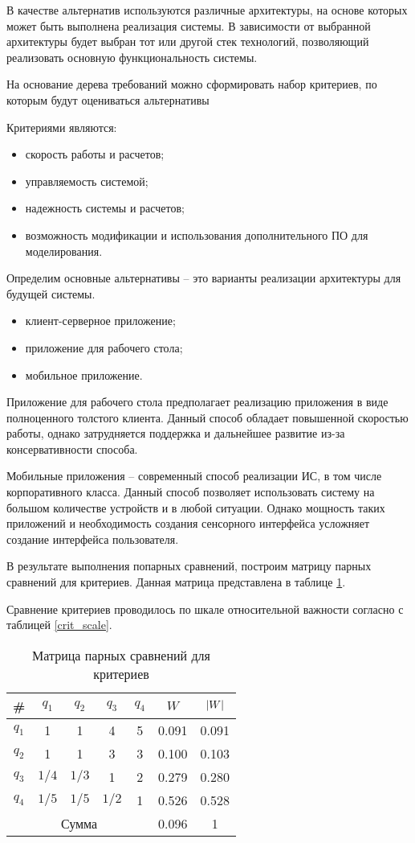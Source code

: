 В качестве альтернатив используются различные архитектуры, на основе которых может быть выполнена реализация системы. 
В зависимости от выбранной архитектуры будет выбран тот или другой стек технологий, позволяющий реализовать основную функциональность системы. 

На основание дерева требований можно сформировать набор критериев, по которым будут оцениваться альтернативы

Критериями являются:
\begin{itemize}
  \item скорость работы и расчетов;
  \item управляемость системой;
  \item надежность системы и расчетов;
  \item возможность модификации и использования дополнительного ПО для моделирования.
\end{itemize}

Определим основные альтернативы – это варианты реализации архитектуры для будущей системы.
\begin{itemize}
    \item клиент-серверное приложение;
    \item приложение для рабочего стола;
    \item мобильное приложение.
\end{itemize}

Приложение для рабочего стола предполагает реализацию приложения в виде полноценного толстого клиента. 
Данный способ обладает повышенной скоростью работы, однако затрудняется поддержка и дальнейшее развитие из-за консервативности способа. 

Мобильные приложения – современный способ реализации ИС, в том числе корпоративного класса. 
Данный способ позволяет использовать систему на большом количестве устройств и в любой ситуации. 
Однако мощность таких приложений и необходимость создания сенсорного интерфейса усложняет создание интерфейса пользователя.

В результате выполнения попарных сравнений, построим матрицу парных сравнений для критериев. 
Данная матрица представлена в таблице \ref{crit_compare}.

Сравнение критериев проводилось по шкале относительной важности согласно с таблицей \ref{crit_scale}.

\begin{table}[H]
    \centering
    \caption{Матрица парных сравнений для критериев}\label{crit_compare}
    \begin{tabular}{|c|c|c|c|c|c|c|}
    \hline \# & $q_1$ & $q_2$ & $q_3$ & $q_4$ & $W$ & $\abs{W}$ \\
    \hline $q_1$ & 1 & 1 & 4 & 5 & 0.091 & 0.091 \\
    \hline $q_2$ & 1 & 1 & 3 & 3 & 0.100 & 0.103 \\
    \hline $q_3$ & $1/4$ & $1/3$ & 1 & 2 & 0.279 & 0.280 \\
    \hline $q_4$ & $1/5$ & $1/5$ & $1/2$ & 1 & 0.526 & 0.528 \\
    \hline \multicolumn{5}{|c|}{Сумма} & 0.096 & 1 \\
    \hline
    \end{tabular}
\end{table}

